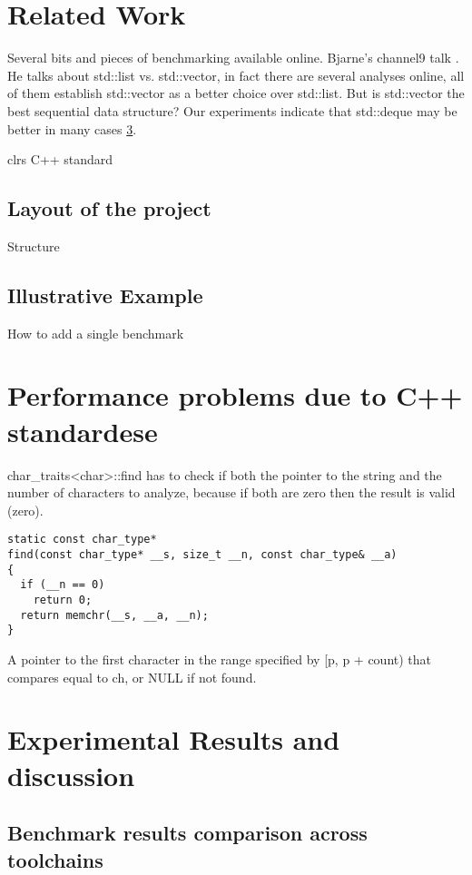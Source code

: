 \documentclass{sig-alternate}
\begin{document}
\section{Related Work}
Several bits and pieces of benchmarking available online.  Bjarne's channel9
talk \cite{stroustrup2012}.  He talks about std::list vs. std::vector, in fact
there are several analyses online, all of them establish std::vector as a better
choice over std::list. But is std::vector the best sequential data structure?
Our experiments indicate that std::deque may be better in many cases
\ref{sec:experiments}.

clrs \cite{clrs}
C++ standard \cite{c++fcd}

\newpage

\subsection{Layout of the project}
Structure

\subsection{Illustrative Example} \label{subsec:example}
How to add a single benchmark \cite{googlebench}
\newpage


\section{Performance problems due to C++ standardese}
char\_traits<char>::find has to check if both the pointer to the string and the
number of characters to analyze, because if both are zero then the result is
valid (zero).


\begin{verbatim}
static const char_type*
find(const char_type* __s, size_t __n, const char_type& __a)
{
  if (__n == 0)
    return 0;
  return memchr(__s, __a, __n);
}
\end{verbatim}

A pointer to the first character in the range specified by [p, p + count) that
  compares equal to ch, or NULL if not found.


\section{Experimental Results and discussion}
\label{sec:experiments}

\subsection{Benchmark results comparison across toolchains}
\end{document}
